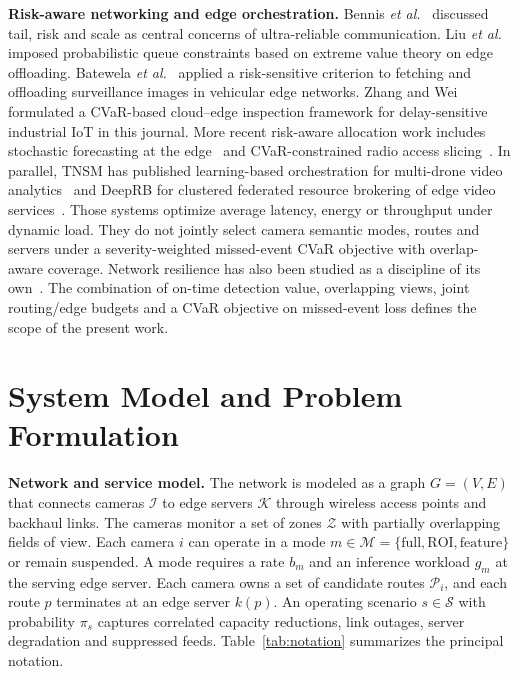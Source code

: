 \documentclass[letterpaper,journal]{IEEEtran}
\begin{document}
\textbf{Risk-aware networking and edge orchestration.} Bennis \emph{et al.}~\cite{bennis2018urllc} discussed tail, risk and scale as central concerns of ultra-reliable communication. Liu \emph{et al.}~\cite{liu2019urllc} imposed probabilistic queue constraints based on extreme value theory on edge offloading. Batewela \emph{et al.}~\cite{batewela2020risk} applied a risk-sensitive criterion to fetching and offloading surveillance images in vehicular edge networks. Zhang and Wei~\cite{liu2021riskaware} formulated a CVaR-based cloud--edge inspection framework for delay-sensitive industrial IoT in this journal. More recent risk-aware allocation work includes stochastic forecasting at the edge~\cite{kokkinakis2025risk} and CVaR-constrained radio access slicing~\cite{mahalakshmi2026cvar}. In parallel, TNSM has published learning-based orchestration for multi-drone video analytics~\cite{qu2024drone} and DeepRB for clustered federated resource brokering of edge video services~\cite{chen2025deeprb}. Those systems optimize average latency, energy or throughput under dynamic load. They do not jointly select camera semantic modes, routes and servers under a severity-weighted missed-event CVaR objective with overlap-aware coverage. Network resilience has also been studied as a discipline of its own~\cite{sterbenz2010resilience,markopoulou2008failures}. The combination of on-time detection value, overlapping views, joint routing/edge budgets and a CVaR objective on missed-event loss defines the scope of the present work.

\section{System Model and Problem Formulation}
\textbf{Network and service model.} The network is modeled as a graph $G=(V,E)$ that connects cameras $\mathcal I$ to edge servers $\mathcal K$ through wireless access points and backhaul links. The cameras monitor a set of zones $\mathcal Z$ with partially overlapping fields of view. Each camera $i$ can operate in a mode $m\in\mathcal M=\{\text{full},\text{ROI},\text{feature}\}$ or remain suspended. A mode requires a rate $b_{m}$ and an inference workload $g_{m}$ at the serving edge server. Each camera owns a set of candidate routes $\mathcal P_i$, and each route $p$ terminates at an edge server $k(p)$. An operating scenario $s\in\mathcal S$ with probability $\pi_s$ captures correlated capacity reductions, link outages, server degradation and suppressed feeds. Table~\ref{tab:notation} summarizes the principal notation.
\end{document}
